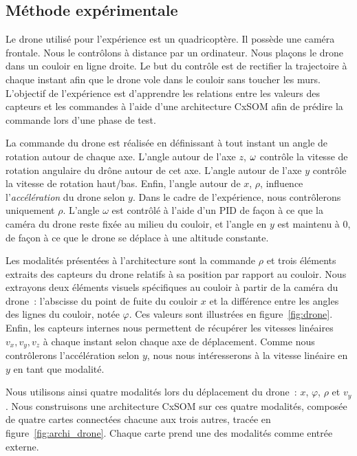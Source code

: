 \documentclass[../main]{subfiles}
\begin{document}
\subsection{Méthode expérimentale}

Le drone utilisé pour l'expérience est un quadricoptère. Il possède une caméra frontale.
Nous le contrôlons à distance par un ordinateur. 
Nous plaçons le drone dans un couloir en ligne droite. Le but du contrôle est de rectifier la trajectoire à chaque instant afin que le drone vole dans le couloir sans toucher les murs. L'objectif de l'expérience est d'apprendre les relations entre les valeurs des capteurs et les commandes à l'aide d'une architecture CxSOM afin de prédire la commande lors d'une phase de test.

La commande du drone est réalisée en définissant à tout instant un angle de rotation autour de chaque axe. 
L'angle autour de l'axe $z$, $\omega$ contrôle la vitesse de rotation angulaire du drône autour de cet axe. L'angle autour de l'axe $y$ contrôle la vitesse de rotation haut/bas. Enfin, l'angle autour de $x$, $\rho$, influence l'\emph{accélération} du drone selon $y$.
Dans le cadre de l'expérience, nous contrôlerons uniquement $\rho$. L'angle $\omega$ est contrôlé à l'aide d'un PID de façon à ce que la caméra du drone reste fixée au milieu du couloir, et l'angle en $y$ est maintenu à 0, de façon à ce que le drone se déplace à une altitude constante.

Les modalités présentées à l'architecture sont la commande $\rho$ et trois éléments extraits des capteurs du drone relatifs à sa position par rapport au couloir.
Nous extrayons deux éléments visuels spécifiques au couloir à partir de la caméra du drone~: l'abscisse du point de fuite du couloir $x$ et la différence entre les angles des lignes du couloir, notée $\varphi$.
Ces valeurs sont illustrées en figure~\ref{fig:drone}.
Enfin, les capteurs internes nous permettent de récupérer les vitesses linéaires $v_x,v_y,v_z$ à chaque instant selon chaque axe de déplacement. Comme nous contrôlerons l'accélération selon $y$, nous nous intéresserons à la vitesse linéaire en $y$ en tant que modalité.

Nous utilisons ainsi quatre modalités lors du déplacement du drone~: $x$, $\varphi$, $\rho$ et $v_y$.
Nous construisons une architecture CxSOM sur ces quatre modalités, composée de quatre cartes connectées chacune aux trois autres, tracée en figure~\ref{fig:archi_drone}. Chaque carte prend une des modalités comme entrée externe.
\end{document}
